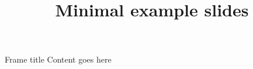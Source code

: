 \documentclass{beamer}
\title{Minimal example slides}
\begin{document}
\begin{frame}[plain]
  \titlepage
\end{frame}

\begin{frame}{Frame title}
  Content goes here
\end{frame}
\end{document}
